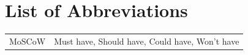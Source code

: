 \documentclass[11pt,a4paper]{article}
\begin{document}
\setcounter{page}{2}

\tableofcontents
\newpage


\listoftables
{}

\vspace{1.5cm}

\section*{List of Abbreviations}
\begin{tabular}{ll}
MoSCoW & Must have, Should have, Could have, Won't have\\
\end{tabular}
\newpage
\end{document}
